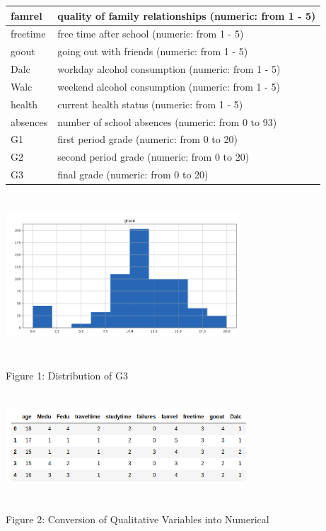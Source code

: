 \documentclass[conference]{IEEEtran}
\begin{document}
\begin{table}[htbp]
\begin{center}
\begin{tabular}{|p{1cm}|p{7cm}|}
\hline
famrel&quality of family relationships (numeric: from 1 - 5)\\
\hline
freetime&free time after school (numeric: from 1 - 5)\\
\hline
goout&going out with friends (numeric: from 1 - 5)\\
\hline
Dalc&workday alcohol consumption (numeric: from 1 - 5)\\
\hline
Walc&weekend alcohol consumption (numeric: from 1 - 5)\\
\hline
health&current health status (numeric: from 1 - 5)\\
\hline
absences&number of school absences (numeric: from 0 to 93)\\
\hline
G1&first period grade (numeric: from 0 to 20)\\
\hline
G2&second period grade (numeric: from 0 to 20)\\
\hline
G3 &final grade (numeric: from 0 to 20)\\
\hline
\end{tabular}
\end{center}
\label{tab1}
\end{table}

\includegraphics[height=6cm,width=8.8cm]{graph.png}
\begin{center}Figure 1: Distribution of G3\end{center}
\includegraphics[height=4cm,width=9cm]{table.png}
\begin{center}Figure 2: Conversion of Qualitative Variables into Numerical\end{center}
\end{document}
